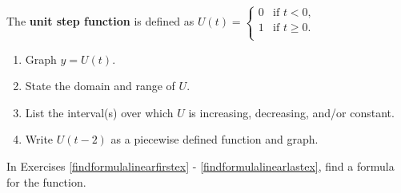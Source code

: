 \begin{exenum}

\item  \label{unitstepexercise} The \textbf{unit step function} is defined as $U(t) = \begin{cases}
    0 &  \text{if $t<0$, } \\
    1  & \text{if $t \geq 0$.} \\
   \end{cases}$

\begin{enumerate}

\item  Graph $y = U(t)$.

\item  State the domain and range of $U$.

\item  List the interval(s) over which $U$ is increasing, decreasing, and/or constant.

\item  Write $U(t-2)$ as a piecewise defined function and graph.

\end{enumerate}

\end{exenum}

In Exercises \ref{findformulalinearfirstex} - \ref{findformulalinearlastex}, find a formula for the function.

